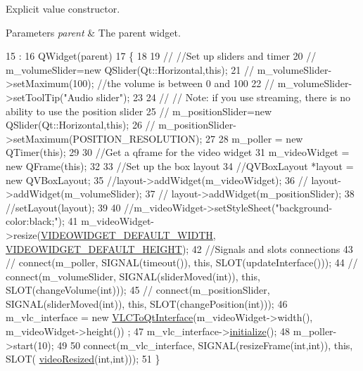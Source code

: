 Explicit value constructor. 


\begin{DoxyParams}{Parameters}
{\em parent} & The parent widget. \\
\hline
\end{DoxyParams}

\begin{DoxyCode}
15                                               :
16     QWidget(parent)
17 \{
18 
19 \textcolor{comment}{//    //Set up sliders and timer}
20 \textcolor{comment}{//    m\_volumeSlider=new QSlider(Qt::Horizontal,this);}
21 \textcolor{comment}{//    m\_volumeSlider->setMaximum(100); //the volume is between 0 and 100}
22 \textcolor{comment}{//    m\_volumeSlider->setToolTip("Audio slider");}
23 
24 \textcolor{comment}{//    // Note: if you use streaming, there is no ability to use the position slider}
25 \textcolor{comment}{//    m\_positionSlider=new QSlider(Qt::Horizontal,this);}
26 \textcolor{comment}{//    m\_positionSlider->setMaximum(POSITION\_RESOLUTION);}
27 
28     m\_poller = \textcolor{keyword}{new} QTimer(\textcolor{keyword}{this});
29 
30     \textcolor{comment}{//Get a qframe for the video widget}
31     m\_videoWidget = \textcolor{keyword}{new} QFrame(\textcolor{keyword}{this});
32 
33     \textcolor{comment}{//Set up the box layout}
34     \textcolor{comment}{//QVBoxLayout *layout = new QVBoxLayout;}
35     \textcolor{comment}{//layout->addWidget(m\_videoWidget);}
36 \textcolor{comment}{//    layout->addWidget(m\_volumeSlider);}
37 \textcolor{comment}{//    layout->addWidget(m\_positionSlider);}
38     \textcolor{comment}{//setLayout(layout);}
39 
40     \textcolor{comment}{//m\_videoWidget->setStyleSheet("background-color:black;");}
41     m\_videoWidget->resize(\hyperlink{vlcvideowidget_8h_a2deec7650a0c6caf3c17a5ddf36d6460}{VIDEOWIDGET\_DEFAULT\_WIDTH}, 
      \hyperlink{vlcvideowidget_8h_afea1bcfd5eabc718d60a92aee2cd7f50}{VIDEOWIDGET\_DEFAULT\_HEIGHT});
42     \textcolor{comment}{//Signals and slots connections}
43 \textcolor{comment}{//    connect(m\_poller, SIGNAL(timeout()), this, SLOT(updateInterface()));}
44 \textcolor{comment}{//    connect(m\_volumeSlider, SIGNAL(sliderMoved(int)), this, SLOT(changeVolume(int)));}
45 \textcolor{comment}{//    connect(m\_positionSlider, SIGNAL(sliderMoved(int)), this, SLOT(changePosition(int)));}
46     m\_vlc\_interface = \textcolor{keyword}{new} \hyperlink{classVLCToQtInterface}{VLCToQtInterface}(m\_videoWidget->width(), m\_videoWidget->height())
      ;
47     m\_vlc\_interface->\hyperlink{classVLCToQtInterface_aaf25e1804b120924ad8b49e36e2bfa8c}{initialize}();
48     m\_poller->start(10);
49 
50     connect(m\_vlc\_interface, SIGNAL(resizeFrame(\textcolor{keywordtype}{int},\textcolor{keywordtype}{int})), \textcolor{keyword}{this}, SLOT(
      \hyperlink{classVLCVideoWidget_aff4501569b0e46b3641625c3c9bbd5c6}{videoResized}(\textcolor{keywordtype}{int},\textcolor{keywordtype}{int})));
51 \}
\end{DoxyCode}
